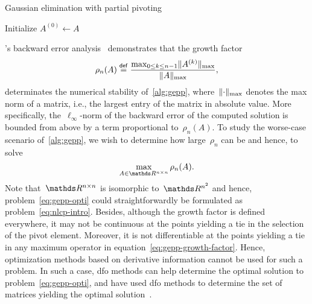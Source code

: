 \begin{algorithm}[htp]
    \caption{Gaussian elimination with partial pivoting}
    \label{alg:gepp}
    \DontPrintSemicolon
    Initialize $A^{(0)} \gets A$\;
\end{algorithm}

's backward error analysis~\cite{Wilkinson_1961} demonstrates that the growth factor
\begin{equation}
    \label{eq:gepp-growth-factor}
    \rho_n(A) \mathrel{\stackrel{\mathsf{def}}{=}} \frac{\max_{0 \le k \le n - 1} \lVert A^{(k)}\rVert_{\max}}{\lVert A\rVert_{\max}},
\end{equation}
determinates the numerical stability of~\cref{alg:gepp}, where~$\lVert\cdot\rVert_{\max}$ denotes the max norm of a matrix, i.e., the largest entry of the matrix in absolute value.
More specifically, the~$\ell_{\infty}$-norm of the backward error of the computed solution is bounded from above by a term proportional to~$\rho_n(A)$.
To study the worse-case scenario of~\cref{alg:gepp}, we wish to determine how large~$\rho_n$ can be and hence, to solve
\begin{equation}
    \label{eq:gepp-opti}
    \max_{A \in \R^{n \times n}} \rho_n(A).
\end{equation}
Note that~$\R^{n \times n}$ is isomorphic to~$\R^{n^2}$ and hence, problem~\cref{eq:gepp-opti} could straightforwardly be formulated as problem~\cref{eq:nlcp-intro}.
Besides, although the growth factor is defined everywhere, it may not be continuous at the points yielding a tie in the selection of the pivot element.
Moreover, it is not differentiable at the points yielding a tie in any maximum operator in equation~\cref{eq:gepp-growth-factor}.
Hence, optimization methods based on derivative information cannot be used for such a problem.
In such a case, \gls{dfo} methods can help determine the optimal solution to problem~\cref{eq:gepp-opti}, and \citeauthor{Higham_Higham_1989} have used \gls{dfo} methods to determine the set of matrices yielding the optimal solution~\cite{Higham_Higham_1989}.

